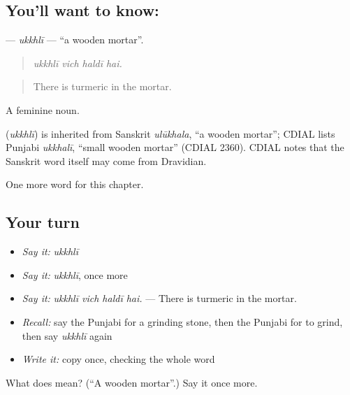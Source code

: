\subsection*{You'll want to know: }
\textbf{} — \emph{ukkhlī} — \textquotedblleft{}a wooden mortar\textquotedblright{}.

\begin{quote}
   
\end{quote}

\begin{quote}
\emph{ukkhlī vich haldī hai.}
\end{quote}

\begin{quote}
There is turmeric in the mortar.
\end{quote}

A feminine noun.

\begin{cousinweb}
\textbf{} (\emph{ukkhlī}) is inherited from Sanskrit \emph{ulūkhala}, \textquotedblleft{}a wooden mortar\textquotedblright{}; CDIAL lists Punjabi \emph{ukkhalī}, \textquotedblleft{}small wooden mortar\textquotedblright{} (CDIAL 2360). CDIAL notes that the Sanskrit word itself may come from Dravidian.
\end{cousinweb}

\begin{grammarlens}[title={What you've built}]
One more word for this chapter.
\end{grammarlens}

\subsection*{Your turn}
\begin{itemize}
\raggedright
  \item \emph{Say it:} \emph{ukkhlī}
  \item \emph{Say it:} \emph{ukkhlī}, once more
  \item \emph{Say it:} \emph{ukkhlī vich haldī hai.} — There is turmeric in the mortar.
  \item \emph{Recall:} say the Punjabi for a grinding stone, then the Punjabi for to grind, then say \emph{ukkhlī} again
  \item \emph{Write it:} copy \textbf{} once, checking the whole word
\end{itemize}

\begin{tcolorbox}[breakable,colback=teal!4,colframe=teal!35!black,title={Before you move on}]
What does  mean? (\textquotedblleft{}A wooden mortar\textquotedblright{}.) Say it once more.
\end{tcolorbox}
